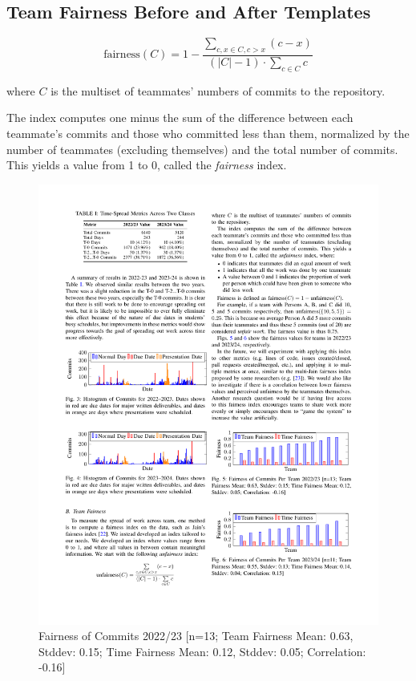 \documentclass[poster, a0, plainboxedsections]{sciposter}
\begin{document}
\begin{multicols}{2}
\section*{Team Fairness Before and After Templates}

$$
\text{fairness}(C) = 1 - \frac{ \sum\limits_{c, x \in C, c > x} (c-x)}{(\left|C\right| -
1) \cdot \sum\limits_{c \in C} c}
$$

\noindent where $C$ is the multiset of teammates' numbers of commits to the 
repository.

The index computes one minus the sum of the difference between each teammate's
commits and those who committed less than them, normalized by the number of
teammates (excluding themselves) and the total number of commits. This yields a
value from 1 to 0, called the \textit{fairness} index.

\begin{figure}[h]
\centering
\includegraphics[width=1.0\linewidth]{../figures/FairnessCommits_22_23.pdf}
\caption{Fairness of Commits 2022/23 [n=13; Team Fairness Mean: 0.63, Stddev: 0.15; Time Fairness Mean: 0.12, Stddev: 0.05; Correlation: -0.16]}\label{Fig:Fairness2022/23}
\end{figure}


\end{multicols}
\end{document}
